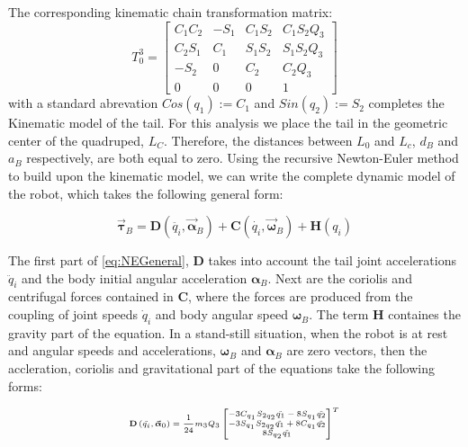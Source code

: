 The corresponding kinematic chain transformation matrix:
\begin{equation}
T_0^3=\begin{bmatrix}
C_1 C_2 & -S_1 & C_1 S_2 & C_1 S_2 Q_3 \\
C_2 S_1 & C_1 & S_1 S_2 & S_1 S_2 Q_3 \\
-S_2 & 0 & C_2 & C_2 Q_3 \\
 0 & 0 & 0 & 1
\end{bmatrix}
\end{equation}
with a standard abrevation $Cos(q_1):=C_1$ and $Sin(q_2):=S_2$ completes the Kinematic model of the tail. For this analysis we place the tail in the geometric center of the quadruped, $L_C$. Therefore, the distances between $L_0$ and $L_c$, $d_B$ and $a_B$ respectively, are both equal to zero. Using the recursive Newton-Euler method to build upon the kinematic model, we can write the complete dynamic model of the robot, which takes the following general form:

\begin{equation}\label{eq:NEGeneral}
\vec{\boldsymbol{\tau}}_B=\mathbf{D}\left ( \ddot{q_i},\vec{\boldsymbol{\alpha}}_B \right )+\mathbf{C}\left ( \dot{q_i},\vec{\boldsymbol{\omega}}_B \right )+\mathbf{H}\left ( {q_i} \right )
\end{equation}

The first part of \eqref{eq:NEGeneral}, $\mathbf{D}$ takes into account the tail joint accelerations $\ddot{q}_i$ and the body initial angular acceleration $\boldsymbol{\alpha}_B$. Next are the coriolis and centrifugal forces contained in $\mathbf{C}$, where the forces are produced from the coupling of joint speeds $\dot{q}_i$ and body angular speed $\boldsymbol{\omega}_B$. The term $\mathbf{H}$ containes the gravity part of the equation. In a stand-still situation, when the robot is at rest and angular speeds and accelerations,  $\boldsymbol{\omega}_B$ and  $\boldsymbol{\alpha}_B$ are zero vectors, then the accleration, coriolis and gravitational part of the equations take the following forms:
 
\begin{gather}
\tiny
\mathbf{D}\left ( \ddot{q_i},\vec{\boldsymbol{\alpha}}_0 \right )=\frac{1}{24} m_3 Q_3 \begin{bmatrix}
-3C_{q_1}S_{2q_2}\ddot{q_1} -8S_{q_1}\ddot{q_2}\\ -3S_{q_1}S_{2q_2}\ddot{q_1} +8C_{q_1}\ddot{q_2} \\ 8S_{q_2}\ddot{q_1}
\end{bmatrix}^T 
\normalsize
\end{gather}

